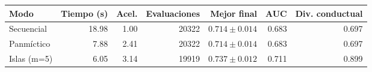 \begin{tabular}{lrrrrrr}
\toprule
Modo & Tiempo (s) & Acel. & Evaluaciones & Mejor final & AUC & Div. conductual \\
\midrule
Secuencial & 18.98 & 1.00 & 20322 & $0.714 \pm 0.014$ & 0.683 & 0.697 \\
Panm\'ictico & 7.88 & 2.41 & 20322 & $0.714 \pm 0.014$ & 0.683 & 0.697 \\
Islas (m=5) & 6.05 & 3.14 & 19919 & $0.737 \pm 0.012$ & 0.711 & 0.899 \\
\bottomrule
\end{tabular}
